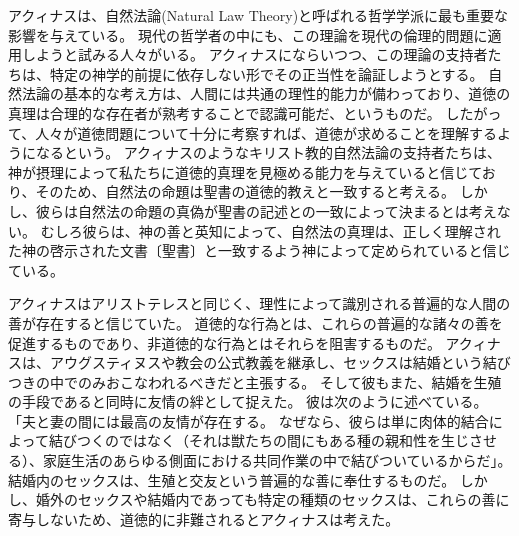 \documentclass[paper=a4,book,openany]{jlreq}
\begin{document}
アクィナスは、自然法論(Natural Law Theory)と呼ばれる哲学学派に最も重要な影響を与えている。
現代の哲学者の中にも、この理論を現代の倫理的問題に適用しようと試みる人々がいる。
アクィナスにならいつつ、この理論の支持者たちは、特定の神学的前提に依存しない形でその正当性を論証しようとする。
自然法論の基本的な考え方は、人間には共通の理性的能力が備わっており、道徳の真理は合理的な存在者が熟考することで認識可能だ、というものだ。
したがって、人々が道徳問題について十分に考察すれば、道徳が求めることを理解するようになるという。
アクィナスのようなキリスト教的自然法論の支持者たちは、神が摂理によって私たちに道徳的真理を見極める能力を与えていると信じており、そのため、自然法の命題は聖書の道徳的教えと一致すると考える。
しかし、彼らは自然法の命題の真偽が聖書の記述との一致によって決まるとは考えない。
むしろ彼らは、神の善と英知によって、自然法の真理は、正しく理解された神の啓示された文書〔聖書〕と一致するよう神によって定められていると信じている。

アクィナスはアリストテレスと同じく、理性によって識別される普遍的な人間の善が存在すると信じていた。
道徳的な行為とは、これらの普遍的な諸々の善を促進するものであり、非道徳的な行為とはそれらを阻害するものだ。
アクィナスは、アウグスティヌスや教会の公式教義を継承し、セックスは結婚という結びつきの中でのみおこなわれるべきだと主張する。
そして彼もまた、結婚を生殖の手段であると同時に友情の絆として捉えた。
彼は次のように述べている。
「夫と妻の間には最高の友情が存在する。
なぜなら、彼らは単に肉体的結合によって結びつくのではなく（それは獣たちの間にもある種の親和性を生じさせる）、家庭生活のあらゆる側面における共同作業の中で結びついているからだ」\citep[Bk.3 Pt. 2 Chap. 123]{aquinas55:_summa_gentil}。
結婚内のセックスは、生殖と交友という普遍的な善に奉仕するものだ。
しかし、婚外のセックスや結婚内であっても特定の種類のセックスは、これらの善に寄与しないため、道徳的に非難されるとアクィナスは考えた。
\end{document}
